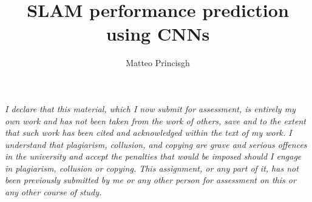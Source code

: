 \documentclass{article}
\title{\textbf{SLAM performance prediction using CNNs}}
\begin{document}
\author{Matteo Princisgh}
\date{}
\maketitle

\begin{center}
\parbox{0.9\textwidth}{
\centering\textit{
I declare that this material, which I now submit for assessment, is entirely my own work and has not been taken from the work of others, save and to the extent that such work has been cited and acknowledged within the text of my work. I understand that plagiarism, collusion, and copying are grave and serious offences in the university and accept the penalties that would be imposed should I engage in plagiarism, collusion or copying. This assignment, or any part of it, has not been previously submitted by me or any other person for assessment on this or any other course of study.}}
\end{center}









\newpage


\end{document}
